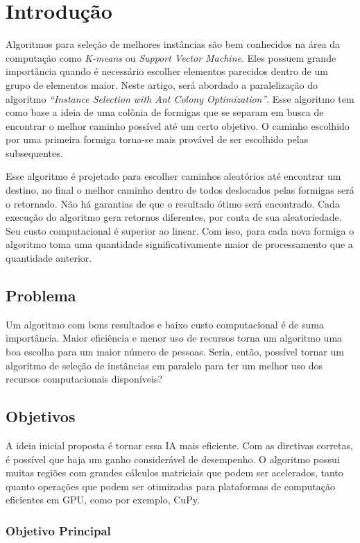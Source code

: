 
\section{Introdução}
Algoritmos para seleção de melhores instâncias são bem conhecidos na área da computação como \emph{K-means} ou \emph{Support
Vector Machine}. Eles possuem grande importância quando é necessário escolher elementos parecidos dentro de um grupo de elementos
maior. Neste artigo, será abordado a paralelização do algoritmo \emph{``Instance Selection with Ant Colony Optimization''}. 
Esse algoritmo tem como base a ideia de uma colônia de formigas que se separam em busca de encontrar o melhor caminho
possível até um certo objetivo. O caminho escolhido por uma primeira formiga torna-se mais provável de ser escolhido
pelas subsequentes.

Esse algoritmo é projetado para escolher caminhos aleatórios até encontrar um destino, no final o melhor caminho dentro de todos deslocados pelas formigas
será o retornado. Não há garantias de que o resultado ótimo será encontrado. Cada execução do algoritmo gera retornos diferentes, por conta
de sua aleatoriedade. Seu custo computacional é superior ao linear. Com isso, para cada nova formiga o algoritmo toma uma quantidade
significativamente maior de processamento que a quantidade anterior.

\subsection{Problema}
Um algoritmo com bons resultados e baixo custo computacional é de suma importância. Maior eficiência e menor uso de recursos
torna um algoritmo uma boa escolha para um maior número de pessoas. Seria, então, possível tornar um algoritmo de seleção de 
instâncias em paralelo para ter um melhor uso dos recursos computacionais disponíveis?


\subsection{Objetivos}

A ideia inicial proposta é tornar essa IA mais eficiente. Com as diretivas corretas, é possível que haja um ganho considerável de 
desempenho. O algoritmo possui muitas regiões com grandes cálculos matriciais que podem ser acelerados, tanto quanto operações que
podem ser otimizadas para plataformas de computação eficientes em GPU, como por exemplo, {CuPy}.

\subsubsection{Objetivo Principal}

